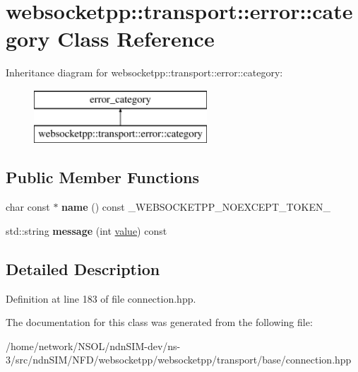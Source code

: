\hypertarget{classwebsocketpp_1_1transport_1_1error_1_1category}{}\section{websocketpp\+:\+:transport\+:\+:error\+:\+:category Class Reference}
\label{classwebsocketpp_1_1transport_1_1error_1_1category}
Inheritance diagram for websocketpp\+:\+:transport\+:\+:error\+:\+:category\+:\begin{figure}[H]
\begin{center}
\leavevmode
\includegraphics[height=2.000000cm]{classwebsocketpp_1_1transport_1_1error_1_1category}
\end{center}
\end{figure}
\subsection*{Public Member Functions}
\begin{DoxyCompactItemize}
\item 
char const  $\ast$ {\bfseries name} () const \+\_\+\+W\+E\+B\+S\+O\+C\+K\+E\+T\+P\+P\+\_\+\+N\+O\+E\+X\+C\+E\+P\+T\+\_\+\+T\+O\+K\+E\+N\+\_\+\hypertarget{classwebsocketpp_1_1transport_1_1error_1_1category_a326b11bd1d14a180089f0562e18c3426}{}\label{classwebsocketpp_1_1transport_1_1error_1_1category_a326b11bd1d14a180089f0562e18c3426}

\item 
std\+::string {\bfseries message} (int \hyperlink{namespacewebsocketpp_1_1transport_1_1error_a8d371a2562d813e5a2e106e2694d4fb0}{value}) const\hypertarget{classwebsocketpp_1_1transport_1_1error_1_1category_aa45247642bb827a91491da22d9e8d07c}{}\label{classwebsocketpp_1_1transport_1_1error_1_1category_aa45247642bb827a91491da22d9e8d07c}

\end{DoxyCompactItemize}


\subsection{Detailed Description}


Definition at line 183 of file connection.\+hpp.



The documentation for this class was generated from the following file\+:\begin{DoxyCompactItemize}
\item 
/home/network/\+N\+S\+O\+L/ndn\+S\+I\+M-\/dev/ns-\/3/src/ndn\+S\+I\+M/\+N\+F\+D/websocketpp/websocketpp/transport/base/connection.\+hpp\end{DoxyCompactItemize}
